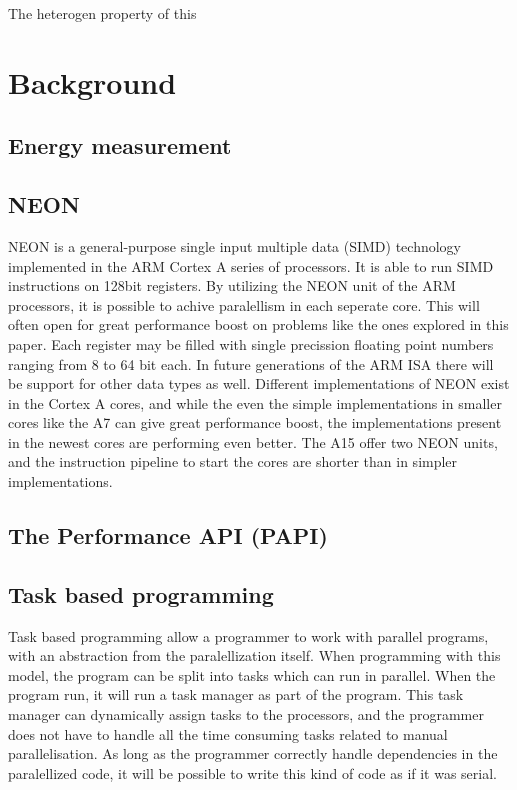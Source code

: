 The heterogen property of this 
\chapter[Background]{Background}

\section{Energy measurement}

\section{NEON}
NEON is a general-purpose single input multiple data (SIMD) technology implemented in the ARM Cortex A series of processors.
It is able to run SIMD instructions on 128bit registers.
By utilizing the NEON unit of the ARM processors, it is possible to achive paralellism in each seperate core.
This will often open for great performance boost on problems like the ones explored in this paper.
Each register may be filled with single precission floating point numbers ranging from 8 to 64 bit each.
In future generations of the ARM ISA there will be support for other data types as well.
Different implementations of NEON exist in the Cortex A cores, and while the even the simple implementations in smaller cores like the A7 can give great performance boost, the implementations present in the newest cores are performing even better.
The A15 offer two NEON units, and the instruction pipeline to start the cores are shorter than in simpler implementations.

\section{The Performance API (PAPI)}

\section{Task based programming}
Task based programming allow a programmer to work with parallel programs, with an abstraction from the paralellization itself.
When programming with this model, the program can be split into tasks which can run in parallel.
When the program run, it will run a task manager as part of the program.
This task manager can dynamically assign tasks to the processors, and the programmer does not have to handle all the time consuming tasks related to manual parallelisation.
As long as the programmer correctly handle dependencies in the paralellized code, it will be possible to write this kind of code as if it was serial.


